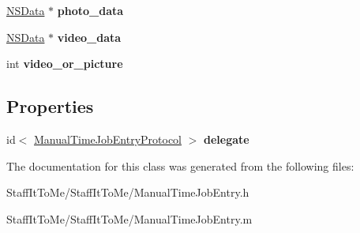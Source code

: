 \begin{DoxyCompactItemize}
\item 
\hypertarget{interface_manual_time_job_entry_a0948a2235d1fdd1a3feeadc138b9318f}{
\hyperlink{class_n_s_data}{\-N\-S\-Data} $\ast$ {\bfseries photo\-\_\-data}}
\label{interface_manual_time_job_entry_a0948a2235d1fdd1a3feeadc138b9318f}

\item 
\hypertarget{interface_manual_time_job_entry_ad34a30a03d75762a3d78c46660f76ce5}{
\hyperlink{class_n_s_data}{\-N\-S\-Data} $\ast$ {\bfseries video\-\_\-data}}
\label{interface_manual_time_job_entry_ad34a30a03d75762a3d78c46660f76ce5}

\item 
\hypertarget{interface_manual_time_job_entry_a93db90eeab36d4ff4cde22e910d1d815}{
int {\bfseries video\-\_\-or\-\_\-picture}}
\label{interface_manual_time_job_entry_a93db90eeab36d4ff4cde22e910d1d815}

\end{DoxyCompactItemize}
\subsection*{\-Properties}
\begin{DoxyCompactItemize}
\item 
\hypertarget{interface_manual_time_job_entry_ab0d2cac4887dfbf5753c34d6b4adcb81}{
id$<$ \hyperlink{protocol_manual_time_job_entry_protocol-p}{\-Manual\-Time\-Job\-Entry\-Protocol} $>$ {\bfseries delegate}}
\label{interface_manual_time_job_entry_ab0d2cac4887dfbf5753c34d6b4adcb81}

\end{DoxyCompactItemize}


\-The documentation for this class was generated from the following files\-:\begin{DoxyCompactItemize}
\item 
\-Staff\-It\-To\-Me/\-Staff\-It\-To\-Me/\-Manual\-Time\-Job\-Entry.\-h\item 
\-Staff\-It\-To\-Me/\-Staff\-It\-To\-Me/\-Manual\-Time\-Job\-Entry.\-m\end{DoxyCompactItemize}
